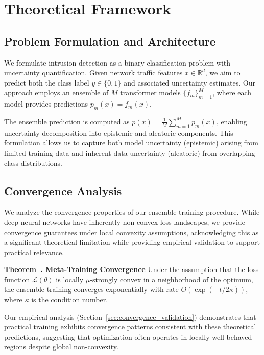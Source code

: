 \documentclass[journal]{IEEEtran}
\newcounter{theorem}
\newenvironment{theorem}[1][]{\refstepcounter{theorem}\par\medskip
   \noindent \textbf{Theorem~\thetheorem. #1} \rmfamily}{\medskip}
\begin{document}
\section{Theoretical Framework}

\subsection{Problem Formulation and Architecture}

We formulate intrusion detection as a binary classification problem with uncertainty quantification. Given network traffic features $x \in \mathbb{R}^d$, we aim to predict both the class label $y \in \{0,1\}$ and associated uncertainty estimates. Our approach employs an ensemble of $M$ transformer models $\{f_m\}_{m=1}^M$, where each model provides predictions $p_m(x) = f_m(x)$.

The ensemble prediction is computed as $\bar{p}(x) = \frac{1}{M} \sum_{m=1}^M p_m(x)$, enabling uncertainty decomposition into epistemic and aleatoric components. This formulation allows us to capture both model uncertainty (epistemic) arising from limited training data and inherent data uncertainty (aleatoric) from overlapping class distributions.

\subsection{Convergence Analysis}

We analyze the convergence properties of our ensemble training procedure. While deep neural networks have inherently non-convex loss landscapes, we provide convergence guarantees under local convexity assumptions, acknowledging this as a significant theoretical limitation while providing empirical validation to support practical relevance.

\begin{theorem}[Meta-Training Convergence]
Under the assumption that the loss function $\mathcal{L}(\theta)$ is locally $\mu$-strongly convex in a neighborhood of the optimum, the ensemble training converges exponentially with rate $O(\exp(-t/2\kappa))$, where $\kappa$ is the condition number.
\end{theorem}

Our empirical analysis (Section~\ref{sec:convergence_validation}) demonstrates that practical training exhibits convergence patterns consistent with these theoretical predictions, suggesting that optimization often operates in locally well-behaved regions despite global non-convexity.
\end{document}
